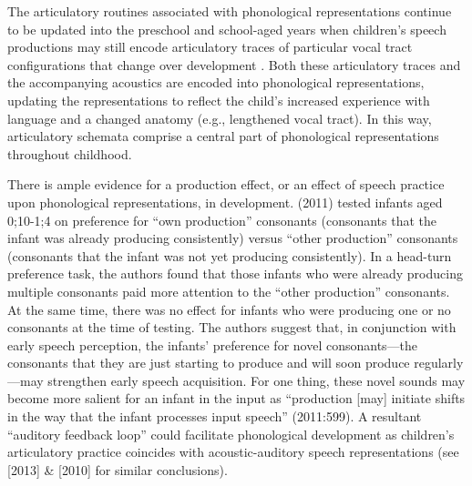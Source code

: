 \documentclass[a4paper,man,natbib,donotrepeattitle, apacite]{apa6}
\begin{document}
The articulatory routines associated with phonological representations continue to be updated into the preschool and school-aged years when children's speech productions may still encode articulatory traces of particular vocal tract configurations that change over development \cite{davisEmergenceDiscretePerceptualMotor2019,mcallisterbyunMotorInfluencesGrammar2016}. Both these articulatory traces and the accompanying acoustics are encoded into phonological representations, updating the representations to reflect the child's increased experience with language and a changed anatomy (e.g., lengthened vocal tract). In this way, articulatory schemata comprise a central part of phonological representations throughout childhood. 

There is ample evidence for a production effect, or an effect of speech practice upon phonological representations, in development. \citeauthor{depaolisProductionPatternsInfluence2011} (2011) tested infants aged 0;10-1;4 on preference for ``own production'' consonants (consonants that the infant was already producing consistently) versus ``other production'' consonants (consonants that the infant was not yet producing consistently). In a head-turn preference task, the authors found that those infants who were already producing multiple consonants paid more attention to the ``other production'' consonants. At the same time, there was no effect for infants who were producing one or no consonants at the time of testing. The authors suggest that, in conjunction with early speech perception, the infants’ preference for novel consonants---the consonants that they are just starting to produce and will soon produce regularly---may strengthen early speech acquisition. For one thing, these novel sounds may become more salient for an infant in the input as ``production [may] initiate shifts in the way that the infant processes input speech'' (2011:599). A resultant ``auditory feedback loop'' \cite{majoranoRelationshipInfantsProduction2014} could facilitate phonological development as children’s articulatory practice coincides with acoustic-auditory speech representations (see \citeauthor{depaolisInfluenceBabblingPatterns2013} [2013] \& \citeauthor{keren-portnoyRoleVocalPractice2010} [2010] for similar conclusions). 
\end{document}
